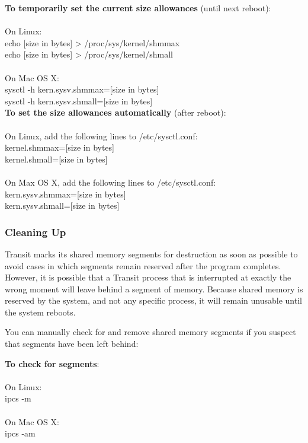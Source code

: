 \documentclass[letterpaper, 12pt]{article}
\begin{document}
\bigskip
\noindent
{\bf To temporarily set the current size allowances} (until next reboot): \\
\\
On Linux: \\
{\tttm [sudo] echo [size in bytes] > /proc/sys/kernel/shmmax} \\
{\tttm [sudo] echo [size in bytes] > /proc/sys/kernel/shmall} \\
\\
On Mac OS X: \\
{\tttm [sudo] sysctl -h kern.sysv.shmmax=[size in bytes]} \\
{\tttm [sudo] sysctl -h kern.sysv.shmall=[size in bytes]} \\

\bigskip
\noindent
{\bf To set the size allowances automatically} (after reboot): \\
\\
On Linux, add the following lines to {\tttm /etc/sysctl.conf}: \\
{\tttm kernel.shmmax=[size in bytes]} \\
{\tttm kernel.shmall=[size in bytes]} \\
\\
On Max OS X, add the following lines to {\tttm /etc/sysctl.conf}: \\
{\tttm kern.sysv.shmmax=[size in bytes]} \\
{\tttm kern.sysv.shmall=[size in bytes]} \\

\subsubsection{Cleaning Up}

Transit marks its shared memory segments for destruction as soon as
possible to avoid cases in which segments remain reserved after the
program completes. However, it is possible that a Transit process that
is interrupted at exactly the wrong moment will leave behind a segment
of memory. Because shared memory is reserved by the system, and not
any specific process, it will remain unusable until the system reboots.

You can manually check for and remove shared memory segments if you
suspect that segments have been left behind: \newline

\noindent
{\bf To check for segments}: \\
\\
On Linux: \\
{\tttm ipcs -m} \\
\\
On Mac OS X: \\
{\tttm ipcs -am} \\
\end{document}
